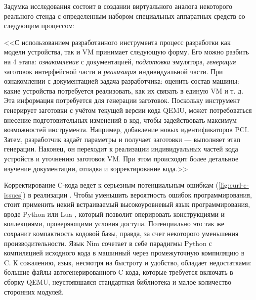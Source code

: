 Задумка исследования \cite{imposters} состоит в создании виртуального аналога некоторого реального стенда
с определенным набором специальных аппаратных средств со следующим процессом:

<<С использованием разработанного инструмента процесс разработки как модели устройства,
так и VM принимает следующую форму.
Его можно разбить на 4 этапа: \textit{ознакомление} с документацией, \textit{подготовка} эмулятора,
\textit{генерация} заготовок интерфейсной части и \textit{реализация} индивидуальной части.
При ознакомлении с документацией задача разработчика: оценить состав
машины: какие устройства потребуется реализовать, как их связать в единую
VM и т. д. Эта информация потребуется для генерации заготовок. Поскольку
инструмент генерирует заготовки с учётом текущей версии кода QEMU,
может потребоваться внесение подготовительных изменений в код, чтобы
задействовать максимум возможностей инструмента. Например, добавление
новых идентификаторов PCI. Затем, разработчик задаёт параметры и получает
заготовки — выполняет этап генерации. Наконец, он переходит к реализации
индивидуальных частей кода устройств и уточнению заготовок VM. При этом
происходит более детальное изучение документации, отладка и
корректирование кода.>>

Корректирование C-кода ведет к серьезным потенциальным ошибкам (\cref{fig:curl-c-issues}) в реализации \cite{qemu-c-style}.
Чтобы уменьшить вероятность ошибок программирования, стоит применить некий встраиваемый
высокоуровневый язык программирования, вроде Python \cite{python} или Lua \cite{lua},
который позволит оперировать конструкциями и коллекциями, проверяющими условия доступа.
Потенциально это так же сохранит компактность кодовой базы,
правда, за счет некоторого уменьшения производительности. \label{better-logic}
Язык Nim \cite{nim} сочетает в себе парадигмы Python с компиляцией исходного кода в машинный через
промежуточную компиляцию в C. К сожалению, язык, несмотря на быстроту и удобство, обладает
недостатками: большие файлы автогенерированного C-кода, которые требуется включать в сборку QEMU,
неустоявшаяся стандартная библиотека и малое количество сторонних модулей.

